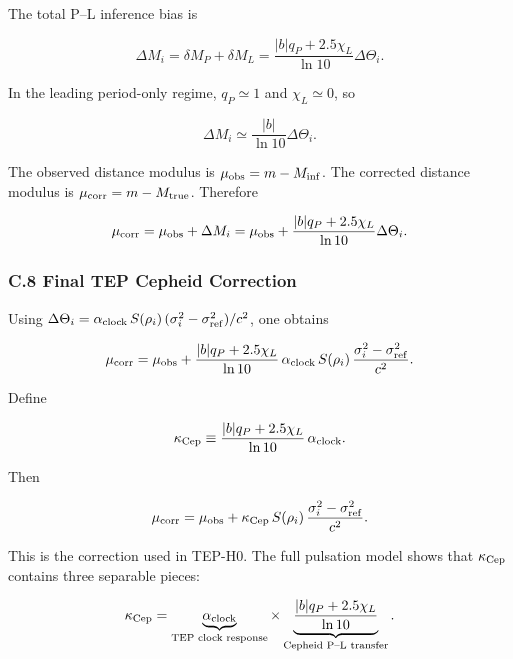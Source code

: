 \documentclass[
]{article}
\begin{document}
The total P--L inference bias is

\begin{equation}
\Delta M_i = \delta M_P + \delta M_L = \frac{|b|q_P + 2.5\chi_L}{\ln 10}\Delta\Theta_i .
\end{equation}

In the leading period-only regime, \(q_P \simeq 1\) and
\(\chi_L \simeq 0\), so

\begin{equation}
\Delta M_i \simeq \frac{|b|}{\ln 10}\Delta\Theta_i .
\end{equation}

The observed distance modulus is \(\mu_{\rm obs} = m - M_{\rm inf}\).
The corrected distance modulus is \(\mu_{\rm corr} = m - M_{\rm true}\).
Therefore

\begin{equation}
\mu_{\rm corr} = \mu_{\rm obs} + \Delta M_i = \mu_{\rm obs} + \frac{|b|q_P + 2.5\chi_L}{\ln 10}\Delta\Theta_i .
\end{equation}

\subsubsection{C.8 Final TEP Cepheid
Correction}\label{c.8-final-tep-cepheid-correction}

Using
\(\Delta\Theta_i = \alpha_{\rm clock}\,S(\rho_i)\,(\sigma_i^2 - \sigma_{\rm ref}^2)/c^2\),
one obtains

\begin{equation}
\mu_{\rm corr} = \mu_{\rm obs} + \frac{|b|q_P + 2.5\chi_L}{\ln 10}\,\alpha_{\rm clock}\,S(\rho_i)\,\frac{\sigma_i^2 - \sigma_{\rm ref}^2}{c^2} .
\end{equation}

Define

\begin{equation}
\kappa_{\rm Cep} \equiv \frac{|b|q_P + 2.5\chi_L}{\ln 10}\,\alpha_{\rm clock} .
\end{equation}

Then

\begin{equation}
\mu_{\rm corr} = \mu_{\rm obs} + \kappa_{\rm Cep}\,S(\rho_i)\,\frac{\sigma_i^2 - \sigma_{\rm ref}^2}{c^2} .
\end{equation}

This is the correction used in TEP-H0. The full pulsation model shows
that \(\kappa_{\rm Cep}\) contains three separable pieces:

\begin{equation}
\kappa_{\rm Cep} = \underbrace{\alpha_{\rm clock}}_{\text{TEP clock response}} \times \underbrace{\frac{|b|q_P + 2.5\chi_L}{\ln 10}}_{\text{Cepheid P--L transfer}} .
\end{equation}
\end{document}
